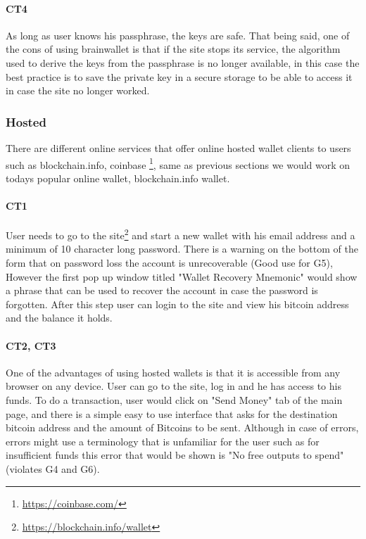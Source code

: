 \paragraph{CT4} As long as user knows his passphrase, the keys are safe. That being said, one of the cons of using brainwallet is that if the site stops its service, the algorithm used to derive the keys from the passphrase is no longer available, in this case the best practice is to save the private key in a secure storage to be able to access it in case the site no longer worked.


\subsubsection{Hosted}
\label{hosted}
There are different online services that offer online hosted wallet clients to users such as blockchain.info, coinbase \footnote{\url{https://coinbase.com/}}, same as previous sections we would work on todays popular online wallet, blockchain.info wallet.

\paragraph{CT1} User needs to go to the site\footnote{\url{https://blockchain.info/wallet}} and start a new wallet with his email address and a minimum of 10 character long password. There is a warning on the bottom of the form that on password loss the account is unrecoverable (Good use for G5), However the first pop up window titled "Wallet Recovery Mnemonic" would show a phrase that can be used to recover the account in case the password is forgotten. After this step user can login to the site and view his bitcoin address and the balance it holds.

\paragraph{CT2, CT3}
\label{hosted transaction}
One of the advantages of using hosted wallets is that it is accessible from any browser on any device. User can go to the site, log in and he has access to his funds. To do a transaction, user would click on "Send Money" tab of the main page, and there is a simple easy to use interface that asks for the destination bitcoin address and the amount of Bitcoins to be sent. Although in case of errors, errors might use a terminology that is unfamiliar for the user such as for insufficient funds this error that would be shown is "No free outputs to spend" (violates G4 and G6).

